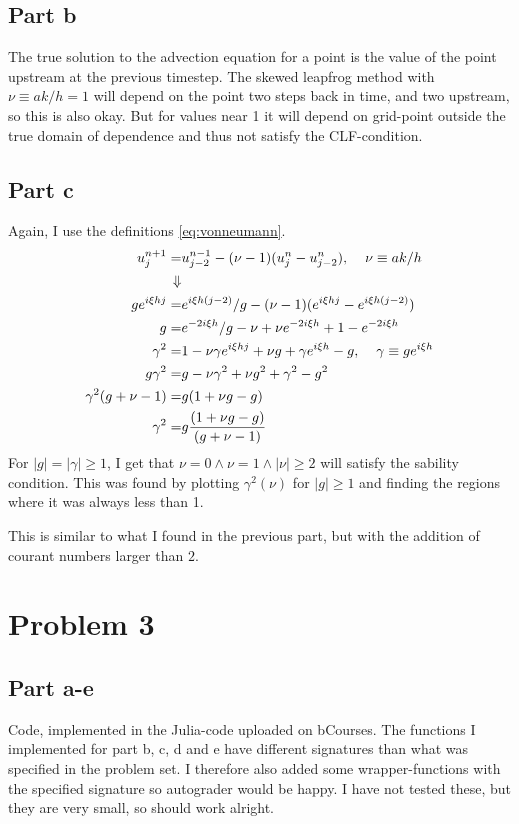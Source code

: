 \documentclass[aps, 12pt]{revtex4}
\begin{document}
\subsection*{Part b}
The true solution to the advection equation for a point is the value of the point upstream at the previous timestep. The skewed leapfrog method with $\nu \equiv ak/h = 1$ will depend on the point two steps back in time, and two upstream, so this is also okay. But for values near 1 it will depend on grid-point outside the true domain of dependence and thus not satisfy the CLF-condition.


\subsection*{Part c}
Again, I use the definitions \eqref{eq:vonneumann}.
\begin{align*}
    u_j^{n+1}=          & u_{j-2}^{n-1}-(\nu - 1)(u_j^n - u_{j-2}^n), \hspace{4mm} \nu \equiv ak/h
    \\
    \Downarrow          &
    \\
    ge^{i\xi hj} =      & e^{i\xi h(j-2)}/g -(\nu -1)(e^{i\xi hj} - e^{i\xi h(j-2)})
    \\
    g =                 & e^{-2i\xi h} / g - \nu + \nu e^{-2i\xi h}
    + 1 - e^{-2i\xi h}
    \\
    \gamma ^2 =         & 1 - \nu\gamma e^{i\xi hj} + \nu g + \gamma e^{i\xi h}-g, \hspace{4mm} \gamma \equiv ge^{i\xi h}
    \\
    g\gamma^2 =         & g - \nu\gamma^2 + \nu g^2 + \gamma^2-g^2
    \\
    \gamma^2(g+\nu-1) = & g(1+\nu g - g)
    \\
    \gamma^2 =          & g\frac{(1+\nu g - g)}{(g+\nu-1)}
\end{align*}
For $|g| = |\gamma| \geq 1$, I get that $\nu=0 \land \nu=1 \land |\nu| \geq 2 $ will satisfy the sability condition. This was found by plotting $\gamma^2(\nu)$ for $|g|\geq 1$ and finding the regions where it was always less than 1.

This is similar to what I found in the previous part, but with the addition of courant numbers larger than $2$.


\section*{Problem 3}
\subsection*{Part a-e}
Code, implemented in the Julia-code uploaded on bCourses. The functions I implemented for part b, c, d and e have different signatures than what was specified in the problem set. I therefore also added some wrapper-functions with the specified signature so autograder would be happy. I have not tested these, but they are very small, so should work alright.
\end{document}
